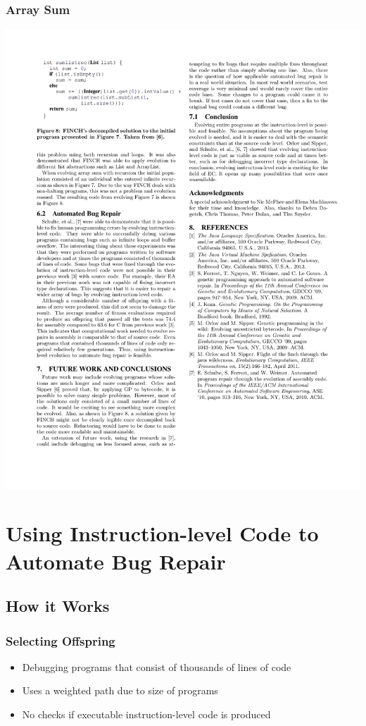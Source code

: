 \documentclass{beamer}
\begin{document}
\begin{frame}
\frametitle{Array Sum}

\includegraphics[height=.38\textheight]{Illustrations/solutionRec.pdf}

\end{frame}












\section[Evolving Assembly]{Using Instruction-level Code to Automate Bug Repair}

\subsection{How it Works}
\begin{frame}
  \frametitle{Selecting Offspring}
  \begin{itemize}
  \item Debugging programs that consist of thousands of lines of code
  \item Uses a weighted path due to size of programs
  \item No checks if executable instruction-level code is produced
  \end{itemize}
\end{frame}
\end{document}
